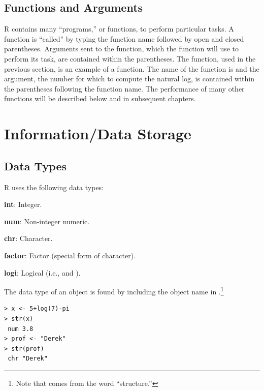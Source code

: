 \documentclass[10pt,openany]{book}\usepackage[]{graphicx}\usepackage[]{color}
\makeatletter
\newenvironment{kframe}{%
 \def\at@end@of@kframe{}%
 \ifinner\ifhmode%
  \def\at@end@of@kframe{\end{minipage}}%
  \begin{minipage}{\columnwidth}%
 \fi\fi%
 \def\FrameCommand##1{\hskip\@totalleftmargin \hskip-\fboxsep
 \colorbox{shadecolor}{##1}\hskip-\fboxsep
     \hskip-\linewidth \hskip-\@totalleftmargin \hskip\columnwidth}%
 \MakeFramed {\advance\hsize-\width
   \@totalleftmargin\z@ \linewidth\hsize
   \@setminipage}}%
 {\par\unskip\endMakeFramed%
 \at@end@of@kframe}
\newenvironment{knitrout}{}{} %
\makeatother
\begin{document}
\subsection{Functions and Arguments}  \label{sect:RFunctions}
R contains many ``programs,'' or functions, to perform particular tasks.  A function is ``called'' by typing the function name followed by open and closed parentheses.  Arguments sent to the function, which the function will use to perform its task, are contained within the parentheses.  The  function, used in the previous section, is an example of a function.  The name of the function is  and the argument, the number for which to compute the natural log, is contained within the parentheses following the function name.  The performance of many other functions will be described below and in subsequent chapters.


\vspace{-12pt}

\vspace{-12pt}


\section{Information/Data Storage}
\vspace{-12pt}
\subsection{Data Types}  \label{sect:RDataTypes}
R uses the following data types:
\begin{Enumerate}
  \item \textbf{int}: Integer.
  \item \textbf{num}: Non-integer numeric.
  \item \textbf{chr}: Character.
  \item \textbf{factor}: Factor (special form of character).
  \item \textbf{logi}: Logical (i.e.,  and ).
\end{Enumerate}
The data type of an object is found by including the object name in .\footnote{Note that  comes from the word ``structure.''}
\begin{knitrout}
\color{fgcolor}\begin{kframe}
\begin{verbatim}
> x <- 5+log(7)-pi
> str(x)
 num 3.8
> prof <- "Derek"
> str(prof)
 chr "Derek"
\end{verbatim}
\end{kframe}
\end{knitrout}
\end{document}
